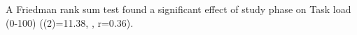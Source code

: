 A Friedman rank sum test found a significant effect of study phase on Task load (0-100) (\chisq(2)=11.38, , r=0.36). 
